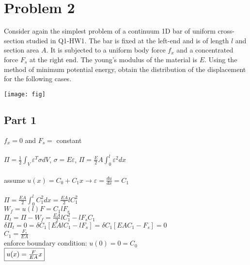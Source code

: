 \documentclass{article}
\begin{document}
\section*{Problem 2}
Consider again the simplest problem of a continuum 1D bar of uniform cross-section studied in Q1-HW1.
The bar is fixed at the left-end and is of length $l$ and section area $A$. It is subjected to a uniform body
force $f_x$ and a concentrated force $F_s$ at the right end. The young’s modulus of the material is $E$. Using
the method of minimum potential energy, obtain the distribution of the displacement for the following cases.
\begin{center}
    \texttt{[image: fig]}
\end{center}

\subsection*{Part 1}
$f_x=0$ and $F_s=$ constant \\\\
$\Pi=\frac{1}{2}\int_V \varepsilon^T\sigma dV$, $\sigma=E\varepsilon$,
$\Pi=\frac{E}{2}A\int_{0}^{l}\varepsilon^2 dx$ \\\\
assume $u(x)=C_0+C_1x \rightarrow \varepsilon=\frac{du}{dx}=C_1$ \\\\
$\Pi=\frac{EA}{2}\int_{0}^{l}C_1^2 dx=\frac{EA}{2}lC_1^2$ \\
$W_f=u(l)F=C_1lF_s$ \\
$\Pi_t=\Pi-W_f=\frac{EA}{2}lC_1^2-lF_sC_1$ \\
$\delta\Pi_t=0=\delta C_1[EAlC_1-lF_s]=\delta C_1[EAC_1-F_s]=0$ \\
$C_1=\frac{F_s}{EA}$ \\
enforce boundary condition: $u(0)=0=C_0$ \\
$\fbox{$u(x)=\frac{F}{EA}x$}$
\end{document}
